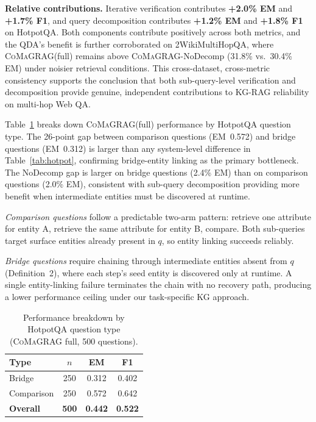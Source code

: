 \documentclass[runningheads]{llncs}
\newcommand{\sys}{\textsc{CoMaGRAG}\xspace}
\begin{document}
\textbf{Relative contributions.} Iterative verification contributes
\textbf{+2.0\% EM} and \textbf{+1.7\% F1}, and query decomposition contributes
\textbf{+1.2\% EM} and \textbf{+1.8\% F1} on HotpotQA. Both components
contribute positively across both metrics, and the QDA's benefit is further
corroborated on 2WikiMultiHopQA, where \sys (full) remains above
\sys-NoDecomp (31.8\% vs.\ 30.4\% EM) under noisier retrieval conditions.
This cross-dataset, cross-metric consistency supports the conclusion that both
sub-query-level verification and decomposition provide genuine, independent
contributions to KG-RAG reliability on multi-hop Web QA.

Table~\ref{tab:type} breaks down \sys (full) performance by HotpotQA question
type. The 26-point gap between comparison questions (EM~0.572) and bridge
questions (EM~0.312) is larger than any system-level difference in
Table~\ref{tab:hotpot}, confirming bridge-entity linking as the primary
bottleneck. The NoDecomp gap is larger on bridge questions (2.4\% EM) than
on comparison questions (2.0\% EM), consistent with sub-query decomposition
providing more benefit when intermediate entities must be discovered at runtime.

\emph{Comparison questions} follow a predictable two-arm pattern: retrieve one
attribute for entity A, retrieve the same attribute for entity B, compare. Both
sub-queries target surface entities already present in $q$, so entity linking
succeeds reliably.

\emph{Bridge questions} require chaining through intermediate entities absent
from $q$ (Definition~2), where each step's seed entity is discovered only at
runtime. A single entity-linking failure terminates the chain with no recovery
path, producing a lower performance ceiling under our task-specific KG approach.

\begin{table}[t]
\centering
\caption{Performance breakdown by HotpotQA question type (\sys full, 500 questions).}
\label{tab:type}
\begin{tabular}{lccc}
\toprule
Type & $n$ & EM & F1 \\
\midrule
Bridge          & 250 & 0.312 & 0.402 \\
Comparison      & 250 & 0.572 & 0.642 \\
\textbf{Overall}& \textbf{500} & \textbf{0.442} & \textbf{0.522} \\
\bottomrule
\end{tabular}
\end{table}
\end{document}

